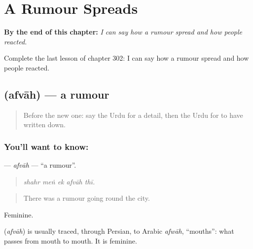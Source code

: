 
\chapter{A Rumour Spreads}
\label{ch:ur-a-rumour-spreads}

\begin{chapteropening}
\textbf{By the end of this chapter:} \emph{I can say how a rumour spread and how people reacted.}

Complete the last lesson of chapter 302: I can say how a rumour spread and how people reacted.
\end{chapteropening}

\section[\texorpdfstring{\ur{افواہ} (afvāh)}{افواہ (afvāh)}]{ (afvāh) — a rumour}

\label{lesson:UR-C302-afvah}



\begin{quote}
Before the new one: say the Urdu for a detail, then the Urdu for to have written down.
\end{quote}

\subsection*{You'll want to know: }
\textbf{} — \emph{afvāh} — \textquotedblleft{}a rumour\textquotedblright{}.

\begin{quote}
    
\end{quote}

\begin{quote}
\emph{shahr meṅ ek afvāh thī.}
\end{quote}

\begin{quote}
There was a rumour going round the city.
\end{quote}

Feminine.

\begin{cousinweb}
\textbf{} (\emph{afvāh}) is usually traced, through Persian, to Arabic \emph{afwāh}, \textquotedblleft{}mouths\textquotedblright{}: what passes from mouth to mouth. It is feminine.
\end{cousinweb}

